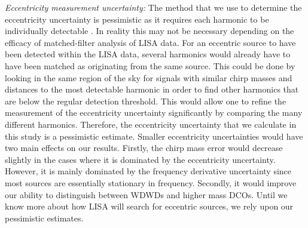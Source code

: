 \textit{Eccentricity measurement uncertainty:} The method that we use to determine the eccentricity uncertainty is pessimistic as it requires each harmonic to be individually detectable \citep[e.g.][]{Lau+2020}. In reality this may not be necessary depending on the efficacy of matched-filter analysis of LISA data. For an eccentric source to have been detected within the LISA data, several harmonics would already have to have been matched as originating from the same source. This could be done by looking in the same region of the sky for signals with similar chirp masses and distances to the most detectable harmonic in order to find other harmonics that are below the regular detection threshold. This would allow one to refine the measurement of the eccentricity uncertainty significantly by comparing the many different harmonics. Therefore, the eccentricity uncertainty that we calculate in this study is a pessimistic estimate. Smaller eccentricity uncertainties would have two main effects on our results. Firstly, the chirp mass error would decrease slightly in the cases where it is dominated by the eccentricity uncertainty. However, it is mainly dominated by the frequency derivative uncertainty since most sources are essentially stationary in frequency. Secondly, it would improve our ability to distinguish between WDWDs and higher mass DCOs. Until we know more about how LISA will search for eccentric sources, we rely upon our pessimistic estimates.